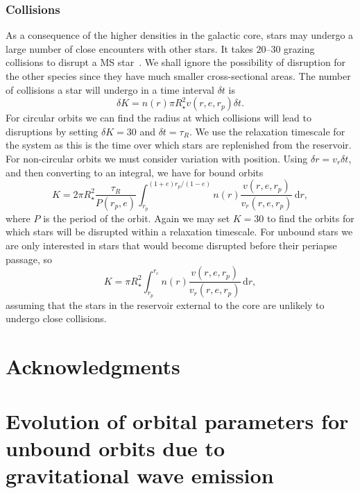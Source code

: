\documentclass[useAMS,usedcolumn,usegraphicx,usenatbib]{mn2e}
\newcommand{\dd}{\ensuremath{\mathrm{d}}}
\newcommand{\intd}[4]{\ensuremath{\int_{#1}^{#2}{#3}\,\dd{#4}}}
\begin{document}
\subsubsection{Collisions}

As a consequence of the higher densities in the galactic core, stars may undergo a large number of close encounters with other stars. It takes $20$--$30$ grazing collisions to disrupt a MS star~\citep{Freitag2006}. We shall ignore the possibility of disruption for the other species since they have much smaller cross-sectional areas. The number of collisions a star will undergo in a time interval $\delta t$ is
\begin{equation}
\delta K = n(r) \pi R_\star^2 v(r,e,r_p)\delta t.
\end{equation}
For circular orbits we can find the radius at which collisions will lead to disruptions by setting $\delta K = 30$ and $\delta t = \tau_R$. We use the relaxation timescale for the system as this is the time over which stars are replenished from the reservoir. For non-circular orbits we must consider variation with position. Using $\delta r = v_r \delta t$, and then converting to an integral, we have for bound orbits
\begin{equation}
K = 2\pi R_\star^2 \frac{\tau_R}{P(r_p,e)}\intd{r_p}{(1+e)r_p/(1-e)}{n(r)\frac{v(r,e,r_p)}{v_r(r,e,r_p)}}{r},
\end{equation}
where $P$ is the period of the orbit. Again we may set $K = 30$ to find the orbits for which stars will be disrupted within a relaxation timescale. For unbound stars we are only interested in stars that would become disrupted before their periapse passage, so
\begin{equation}
K = \pi R_\star^2 \intd{r_p}{r_c}{n(r)\frac{v(r,e,r_p)}{v_r(r,e,r_p)}}{r},
\end{equation}
assuming that the stars in the reservoir external to the core are unlikely to undergo close collisions.


\section*{Acknowledgments}






\appendix

\section[]{Evolution of orbital parameters for unbound orbits due to gravitational wave emission}
\end{document}
